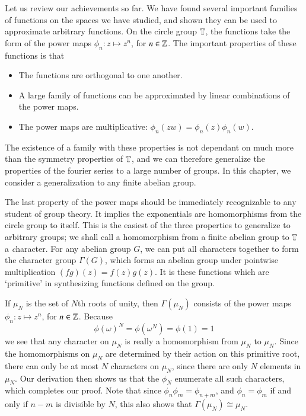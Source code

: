 Let us review our achievements so far. We have found several important families of functions on the spaces we have studied, and shown they can be used to approximate arbitrary functions. On the circle group $\operatorname{\mathbb{T}}$, the functions take the form of the power maps $\phi_n: z \mapsto z^n$, for $n \in \operatorname{\mathbb{Z}}$. The important properties of these functions is that
%
\begin{itemize}
    \item The functions are orthogonal to one another.
    \item A large family of functions can be approximated by linear combinations of the power maps.
    \item The power maps are multiplicative: $\phi_n(zw) = \phi_n(z) \phi_n(w)$.
\end{itemize}
%
The existence of a family with these properties is not dependant on much more than the symmetry properties of $\operatorname{\mathbb{T}}$, and we can therefore generalize the properties of the fourier series to a large number of groups. In this chapter, we consider a generalization to any finite abelian group.

The last property of the power maps should be immediately recognizable to any student of group theory. It implies the exponentials are homomorphisms from the circle group to itself. This is the easiest of the three properties to generalize to arbitrary groups; we shall call a homomorphism from a finite abelian group to $\operatorname{\mathbb{T}}$ a {\emph character}. For any abelian group $G$, we can put all characters together to form the character group $\Gamma(G)$, which forms an abelian group under pointwise multiplication $(fg)(z) = f(z)g(z)$. It is these functions which are `primitive' in synthesizing functions defined on the group.

\begin{example}
    If $\mu_N$ is the set of $N$th roots of unity, then $\Gamma(\mu_N)$ consists of the power maps $\phi_n: z \mapsto z^n$, for $n \in \operatorname{\mathbb{Z}}$. Because
    \[ \phi(\omega)^N = \phi(\omega^N) = \phi(1) = 1 \]
    we see that any character on $\mu_N$ is really a homomorphism from $\mu_N$ to $\mu_N$. Since the homomorphisms on $\mu_N$ are determined by their action on this primitive root, there can only be at most $N$ characters on $\mu_N$, since there are only $N$ elements in $\mu_N$. Our derivation then shows us that the $\phi_N$ enumerate all such characters, which completes our proof. Note that since $\phi_n \phi_m = \phi_{n+m}$, and $\phi_n = \phi_m$ if and only if $n - m$ is divisible by $N$, this also shows that $\Gamma(\mu_N) \cong \mu_N$.
\end{example}

